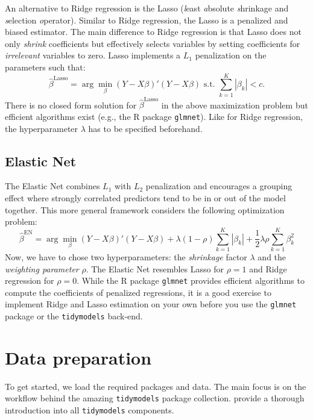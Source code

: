 \documentclass[
]{krantz}
\begin{document}
An alternative to Ridge regression is the Lasso (\emph{l}east \emph{a}bsolute \emph{s}hrinkage and \emph{s}election \emph{o}perator). Similar to Ridge regression, the Lasso \citep{Tibshirani1996} is a penalized and biased estimator.
The main difference to Ridge regression is that Lasso does not only \emph{shrink} coefficients but effectively selects variables by setting coefficients for \emph{irrelevant} variables to zero. Lasso implements a \(L_1\) penalization on the parameters such that: \[\hat\beta^\text{Lasso} = \arg\min_\beta \left(Y - X\beta\right)'\left(Y - X\beta\right)\text{ s.t. } \sum\limits_{k=1}^K|\beta_k| < c.\] There is no closed form solution for \(\hat\beta^\text{Lasso}\) in the above maximization problem but efficient algorithms exist (e.g., the R package \texttt{glmnet}). Like for Ridge regression, the hyperparameter \(\lambda\) has to be specified beforehand.

\hypertarget{elastic-net}{%
\subsection{Elastic Net}\label{elastic-net}}

The Elastic Net \citep{Zou2005} combines \(L_1\) with \(L_2\) penalization and encourages a grouping effect where strongly correlated predictors tend to be in or out of the model together. This more general framework considers the following optimization problem: \[\hat\beta^\text{EN} = \arg\min_\beta \left(Y - X\beta\right)'\left(Y - X\beta\right) + \lambda(1-\rho)\sum\limits_{k=1}^K|\beta_k| +\frac{1}{2}\lambda\rho\sum\limits_{k=1}^K\beta_k^2\] Now, we have to chose two hyperparameters: the \emph{shrinkage} factor \(\lambda\) and the \emph{weighting parameter} \(\rho\). The Elastic Net resembles Lasso for \(\rho = 1\) and Ridge regression for \(\rho = 0\). While the R package \texttt{glmnet} provides efficient algorithms to compute the coefficients of penalized regressions, it is a good exercise to implement Ridge and Lasso estimation on your own before you use the \texttt{glmnet} package or the \texttt{tidymodels} back-end.

\hypertarget{data-preparation-5}{%
\section{Data preparation}\label{data-preparation-5}}

To get started, we load the required packages and data. The main focus is on the workflow behind the amazing \texttt{tidymodels} package collection. \citet{Kuhn2022} provide a thorough introduction into all \texttt{tidymodels} components.
\end{document}
